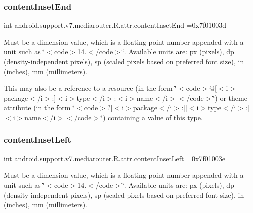 \subsubsection{\texorpdfstring{content\+Inset\+End}{contentInsetEnd}}
{\footnotesize\ttfamily int android.\+support.\+v7.\+mediarouter.\+R.\+attr.\+content\+Inset\+End =0x7f01003d\hspace{0.3cm}{\ttfamily [static]}}

Must be a dimension value, which is a floating point number appended with a unit such as \char`\"{}$<$code$>$14.\+5sp$<$/code$>$\char`\"{}. Available units are\+: px (pixels), dp (density-\/independent pixels), sp (scaled pixels based on preferred font size), in (inches), mm (millimeters). 

This may also be a reference to a resource (in the form \char`\"{}$<$code$>$@\mbox{[}$<$i$>$package$<$/i$>$\+:\mbox{]}$<$i$>$type$<$/i$>$\+:$<$i$>$name$<$/i$>$$<$/code$>$\char`\"{}) or theme attribute (in the form \char`\"{}$<$code$>$?\mbox{[}$<$i$>$package$<$/i$>$\+:\mbox{]}\mbox{[}$<$i$>$type$<$/i$>$\+:\mbox{]}$<$i$>$name$<$/i$>$$<$/code$>$\char`\"{}) containing a value of this type. \mbox{\label{classandroid_1_1support_1_1v7_1_1mediarouter_1_1R_1_1attr_a00da2882f3185a4fb35023d1fa0fb37a}} 
\subsubsection{\texorpdfstring{content\+Inset\+Left}{contentInsetLeft}}
{\footnotesize\ttfamily int android.\+support.\+v7.\+mediarouter.\+R.\+attr.\+content\+Inset\+Left =0x7f01003e\hspace{0.3cm}{\ttfamily [static]}}

Must be a dimension value, which is a floating point number appended with a unit such as \char`\"{}$<$code$>$14.\+5sp$<$/code$>$\char`\"{}. Available units are\+: px (pixels), dp (density-\/independent pixels), sp (scaled pixels based on preferred font size), in (inches), mm (millimeters). 

